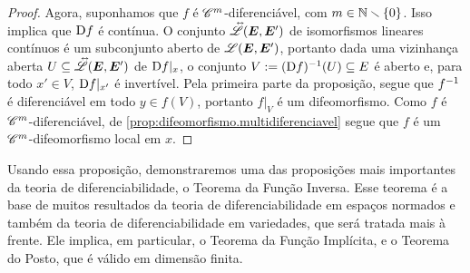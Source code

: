 \begin{proof}
\begin{comment}
Portanto $r'$
\end{comment}

Agora, suponhamos que $f$ é $\mathscr{C}^m$-diferenciável, com $m \in \mathbb{N} \smallsetminus \{0\}$. Isso implica que $\mathrm{D} f$ é contínua. O conjunto $\accentset{\leftrightarrow}{\mathscr{L}}(\bm E, \bm E')$ de isomorfismos lineares contínuos é um subconjunto aberto de $\mathscr{L}(\bm E, \bm E')$, portanto dada uma vizinhança aberta $U \subseteq \accentset{\leftrightarrow}{\mathscr{L}}(\bm E, \bm E')$ de $\mathrm{D} f|_x$, o conjunto $V := (\mathrm{D} f)^{-1} (U) \subseteq E$ é aberto e, para todo $x' \in V$, $\mathrm{D} f|_{x'}$ é invertível. Pela primeira parte da proposição, segue que $f^{-1}$ é diferenciável em todo $y \in f(V)$, portanto $f|_V$ é um difeomorfismo. Como $f$ é $\mathscr{C}^m$-diferenciável, de \ref{prop:difeomorfismo.multidiferenciavel} segue que $f$ é um $\mathscr{C}^m$-difeomorfismo local em $x$.
\end{proof}

Usando essa proposição, demonstraremos uma das proposições mais importantes da teoria de diferenciabilidade, o Teorema da Função Inversa. Esse teorema é a base de muitos resultados da teoria de diferenciabilidade em espaços normados e também da teoria de diferenciabilidade em variedades, que será tratada mais à frente. Ele implica, em particular, o Teorema da Função Implícita, e o Teorema do Posto, que é válido em dimensão finita.

